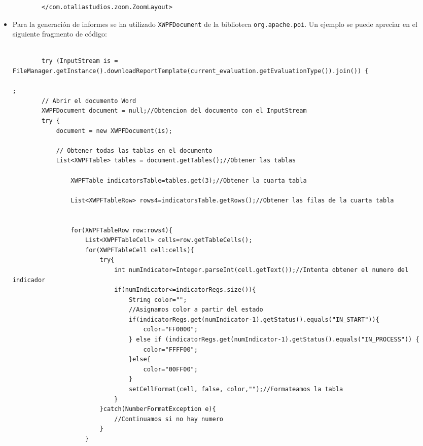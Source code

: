 \begin{itemize}
\begin{lstlisting}
        </com.otaliastudios.zoom.ZoomLayout>
    \end{lstlisting}
    \item Para la generación de informes se ha utilizado \texttt{XWPFDocument}
    de la biblioteca \texttt{org.apache.poi}\cite{apacheXWPFDocumentPOI}. Un ejemplo se puede apreciar en el siguiente fragmento de código:
    \begin{lstlisting}

        try (InputStream is = FileManager.getInstance().downloadReportTemplate(current_evaluation.getEvaluationType()).join()) {

;
        // Abrir el documento Word
        XWPFDocument document = null;//Obtencion del documento con el InputStream
        try {
            document = new XWPFDocument(is);

            // Obtener todas las tablas en el documento
            List<XWPFTable> tables = document.getTables();//Obtener las tablas

                XWPFTable indicatorsTable=tables.get(3);//Obtener la cuarta tabla

                List<XWPFTableRow> rows4=indicatorsTable.getRows();//Obtener las filas de la cuarta tabla


                for(XWPFTableRow row:rows4){
                    List<XWPFTableCell> cells=row.getTableCells();
                    for(XWPFTableCell cell:cells){
                        try{
                            int numIndicator=Integer.parseInt(cell.getText());//Intenta obtener el numero del indicador
                            if(numIndicator<=indicatorRegs.size()){
                                String color="";
                                //Asignamos color a partir del estado
                                if(indicatorRegs.get(numIndicator-1).getStatus().equals("IN_START")){
                                    color="FF0000";
                                } else if (indicatorRegs.get(numIndicator-1).getStatus().equals("IN_PROCESS")) {
                                    color="FFFF00";
                                }else{
                                    color="00FF00";
                                }
                                setCellFormat(cell, false, color,"");//Formateamos la tabla
                            }
                        }catch(NumberFormatException e){
                            //Continuamos si no hay numero
                        }
                    }


\end{lstlisting}
\end{itemize}
